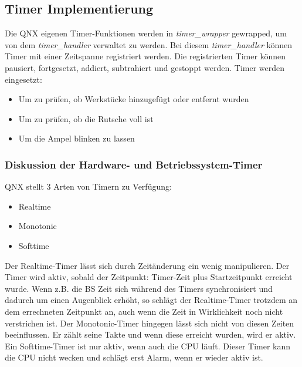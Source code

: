 \documentclass[oneside,a4paper,titlepage]{scrartcl}              %
\begin{document}
\subsection{Timer Implementierung}
Die QNX eigenen Timer-Funktionen werden in \emph{timer\_wrapper} gewrapped, um von dem \emph{timer\_handler} verwaltet zu werden. Bei diesem \emph{timer\_handler} können Timer mit einer Zeitspanne registriert werden.
Die registrierten Timer können pausiert, fortgesetzt, addiert, subtrahiert und gestoppt werden.\newline\newline
Timer werden eingesetzt:
\begin{itemize}
    \item Um zu prüfen, ob Werkstücke hinzugefügt oder entfernt wurden
    \item Um zu prüfen, ob die Rutsche voll ist
    \item Um die Ampel blinken zu lassen
\end{itemize}

\subsubsection{Diskussion der Hardware- und Betriebssystem-Timer}
QNX stellt 3 Arten von Timern zu Verfügung:

\begin{itemize}
  \item Realtime
  \item Monotonic
  \item Softtime
\end{itemize}
Der Realtime-Timer lässt sich durch Zeitänderung ein wenig manipulieren. Der Timer wird aktiv, sobald der Zeitpunkt: Timer-Zeit plus Startzeitpunkt erreicht wurde.
Wenn z.B. die BS Zeit sich während des Timers synchronisiert und dadurch um einen Augenblick erhöht, so schlägt der Realtime-Timer trotzdem an dem errechneten Zeitpunkt an, auch wenn die Zeit in Wirklichkeit noch nicht verstrichen ist.\newline
Der Monotonic-Timer hingegen lässt sich nicht von diesen Zeiten beeinflussen. Er zählt seine Takte und wenn diese erreicht wurden, wird er aktiv.\newline
Ein Softtime-Timer ist nur aktiv, wenn auch die CPU läuft. Dieser Timer kann die CPU nicht wecken und schlägt erst Alarm, wenn er wieder aktiv ist.

\newpage

\end{document}
